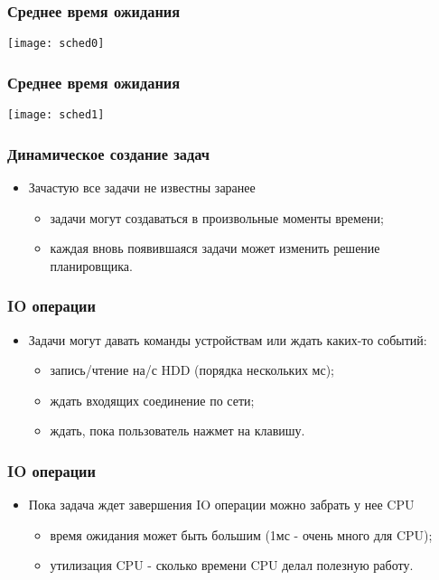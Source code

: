 \begin{frame}
\frametitle{Среднее время ожидания}
\texttt{[image: sched0]}
\end{frame}

\begin{frame}
\frametitle{Среднее время ожидания}
\texttt{[image: sched1]}
\end{frame}

\begin{frame}
\frametitle{Динамическое создание задач}
\begin{itemize}
    \item<1->Зачастую все задачи не известны заранее
    \begin{itemize}
        \item<2->задачи могут создаваться в произвольные моменты времени;
        \item<3->каждая вновь появившаяся задачи может изменить решение
             планировщика.
    \end{itemize}
\end{itemize}
\end{frame}

\begin{frame}
\frametitle{IO операции}
\begin{itemize}
    \item<1->Задачи могут давать команды устройствам или ждать каких-то событий:
    \begin{itemize}
        \item<2->запись/чтение на/с HDD (порядка нескольких мс);
        \item<3->ждать входящих соединение по сети;
        \item<4->ждать, пока пользователь нажмет на клавишу.
    \end{itemize}
\end{itemize}
\end{frame}

\begin{frame}
\frametitle{IO операции}
\begin{itemize}
    \item<1->Пока задача ждет завершения IO операции можно забрать у нее CPU
    \begin{itemize}
        \item<2->время ожидания может быть большим (1мс - очень много для CPU);
        \item<3->утилизация CPU - сколько времени CPU делал полезную работу.
    \end{itemize}
\end{itemize}
\end{frame}

